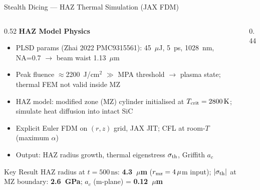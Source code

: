 \documentclass[aspectratio=169,11pt]{beamer}
\begin{document}
\begin{frame}[shrink=10]{Stealth Dicing --- HAZ Thermal Simulation (JAX FDM)}
  \begin{columns}[T]
    \begin{column}{0.52\textwidth}
      \textbf{HAZ Model Physics}
      \begin{itemize}
        \item PLSD params (Zhai 2022 PMC9315561): 45~$\mu$J, 5~ps, 1028~nm,
              NA=0.7 $\to$ beam waist 1.13~$\mu$m
        \item Peak fluence $\approx$2200~J/cm$^2$ $\gg$ MPA threshold
              $\to$ plasma state; thermal FEM not valid inside MZ
        \item HAZ model: modified zone (MZ) cylinder initialised at
              $T_{\rm crit} = 2800\,\mathrm{K}$;
              simulate heat diffusion into intact SiC
        \item Explicit Euler FDM on $(r,z)$ grid, JAX JIT;
              CFL at room-$T$ (maximum $\alpha$)
        \item Output: HAZ radius growth, thermal eigenstress
              $\sigma_{\rm th}$, Griffith $a_c$
      \end{itemize}

      \vspace{0.4em}
      \begin{block}{Key Result}
        \small
        HAZ radius at $t=500\,\mathrm{ns}$: \textbf{4.3~$\mu$m}
        ($r_{\rm mz}=4\,\mu$m input);
        $|\sigma_{\rm th}|$ at MZ boundary: \textbf{2.6~GPa};
        $a_c$ (m-plane) = \textbf{0.12~$\mu$m}
      \end{block}
    \end{column}
    \begin{column}{0.44\textwidth}
      \centering
\end{column}
\end{columns}
\end{frame}
\end{document}
